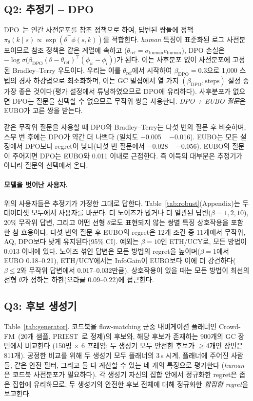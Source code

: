 

\subsection{Q2: 추정기 -- DPO}
\label{sec:dpo}
DPO~\citep{rafailov2023direct}는 인간 사전분포를 참조 정책으로 하여, 답변된 쌍들에 정책 $\pi_\theta(k \mid s) \propto \exp(\theta^\top\phi(s,k))$를
적합한다. \emph{human} 특징이 표준화된 로그 사전분포이므로 참조 정책은 같은 계열에 속하고
($\theta_{\text{ref}} = \sigma_{\text{human}} e_{\text{human}}$), DPO 손실은
$-\log\sigma\bigl(\beta_{\text{DPO}}(\theta - \theta_{\text{ref}})^\top(\phi_w - \phi_l)\bigr)$가 된다. 이는 사후분포 없이
사전분포에 고정된 Bradley--Terry 우도이다. 우리는 이를 $\theta_{\text{ref}}$에서 시작하여 $\beta_{\text{DPO}}=0.3$으로 1{,}000 스텝의 경사 하강법으로 최소화하며,
이는 GC 밀집에서 열 가지 $(\beta_{\text{DPO}}, \text{steps})$ 설정 중 가장 좋은 것이다(평가 설정에서 튜닝하였으므로 DPO에 유리하다).
사후분포가 없으면 DPO는 질문을 선택할 수 없으므로 무작위 쌍을 사용한다. \emph{DPO + EUBO 질문}은 EUBO가 고른 쌍을 받는다.

같은 무작위 질문을 사용할 때 DPO와 Bradley--Terry는 다섯 번의 질문 후 비슷하며, 스무 번 후에는 DPO가 약간 더 나쁘다
(일치도 $-$0.005 ~ $-$0.016). EUBO는 모든 설정에서 DPO보다 regret이 낮다(다섯 번 질문에서 $-$0.028 ~ $-$0.056).
EUBO의 질문이 주어지면 DPO는 EUBO와 0.011 이내로 근접한다. 즉 이득의 대부분은 추정기가 아니라 질문의 선택에서 온다.

\paragraph{모델을 벗어난 사용자.}
위의 사용자들은 추정기가 가정한 그대로 답한다. Table~\ref{tab:robust}(Appendix)는 두 데이터셋 모두에서 사용자를 바꾼다. 더 노이즈가 많거나
더 일관된 답변($\beta=1,2,10$), 20\% 무작위 답변, 그리고 어떤 선형 $\theta$로도 표현되지 않는 쌍별 특징 상호작용을 포함한
참 효용이다. 다섯 번의 질문 후 EUBO의 regret은 12개 조건 중 11개에서 무작위, AQ, DPO보다 낮게 유지된다(95\% CI). 예외는
$\beta=10$인 ETH/UCY로, 모든 방법이 0.013 이내에 있다. 노이즈 섞인 답변은 모든 방법의 regret을 높이며($\beta=1$에서 EUBO 0.18--0.21),
ETH/UCY에서는 InfoGain이 EUBO보다 이에 더 강건하다($\beta \le 2$와 무작위 답변에서 0.017--0.032만큼). 상호작용이 있을 때는 모든
방법이 최선의 선형 $\theta$가 정하는 하한(오라클 0.09--0.22)에 접근한다.

\subsection{Q3: 후보 생성기}
Table~\ref{tab:generator}. 코드북을 flow-matching 군중 내비게이션 플래너인
Crowd-FM~\citep{singha2026crowdfm}(20개 샘플, PRIEST~\citep{rastgar2024priest}로 정제)의 후보와, 해당 후보가 존재하는 900개의 GC 장면에서 비교한다
(150명 $\times$ 6 프레임; 두 생성기 모두 안전한 후보가 $\ge$4개인 장면은 811개). 공정한 비교를 위해 두 생성기 모두
플래너의 3\,s 시계, 플래너에 주어진 사람들, 같은 안전 필터, 그리고 둘 다 계산할 수 있는 네 개의 특징으로 평가한다
(\emph{human}은 코드북 사전분포가 필요하다). 각 생성기 자신의 집합 안에서 정규화한 regret은 좁은 집합에 유리하므로,
두 생성기의 안전한 후보 전체에 대해 정규화한 \emph{합집합 regret}을 보고한다.

